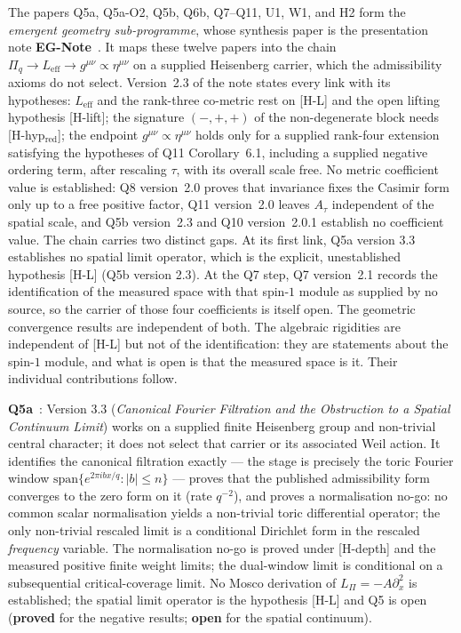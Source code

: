 \documentclass[11pt,a4paper]{article}
\newcommand{\sproved}{\textcolor{cproved}{\textbf{proved}}}
\newcommand{\sopen}{\textcolor{copen}{\textbf{open}}}
\begin{document}
    The papers Q5a, Q5a-O2, Q5b, Q6b, Q7--Q11, U1, W1, and H2 form the \emph{emergent geometry
  sub-programme}, whose synthesis paper is the presentation note \textbf{EG-Note}~\cite{Beau2026egnote}.
    It maps these twelve papers into the chain $\Pi_q \to L_{\mathrm{eff}} \to g^{\mu\nu} \propto \eta^{\mu\nu}$
    on a supplied Heisenberg carrier, which the admissibility axioms do not select.
    Version~2.3 of the note states every link with its hypotheses: $L_{\mathrm{eff}}$ and the rank-three co-metric
    rest on [H-L] and the open lifting hypothesis [H-lift]; the signature $(-,+,+)$ of the non-degenerate block
    needs [H-hyp$_{\mathrm{red}}$]; the endpoint $g^{\mu\nu} \propto \eta^{\mu\nu}$ holds only for a supplied rank-four
    extension satisfying the hypotheses of Q11 Corollary~6.1, including a supplied negative ordering term, after
    rescaling $\tau$, with its overall scale free.
    No metric coefficient value is established: Q8 version~2.0 proves that invariance fixes the Casimir form only up
    to a free positive factor, Q11 version~2.0 leaves $A_\tau$ independent of the spatial scale, and Q5b
    version~2.3 and Q10 version~2.0.1 establish no coefficient value.
    The chain carries two distinct gaps.
    At its first link, Q5a version 3.3 establishes no spatial limit operator, which is the explicit,
    unestablished hypothesis [H-L] (Q5b version 2.3).
    At the Q7 step, Q7 version~2.1 records the identification of the measured space with that
    spin-$1$ module as supplied by no source, so the carrier of those four coefficients is itself
    open.
    The geometric convergence results are independent of both.
    The algebraic rigidities are independent of [H-L] but not of the identification: they are
    statements about the spin-$1$ module, and what is open is that the measured space is it.
    Their individual contributions follow.

    \textbf{Q5a}~\cite{Beau2026q5a}: Version 3.3 (\emph{Canonical Fourier Filtration and the
    Obstruction to a Spatial Continuum Limit}) works on a supplied finite Heisenberg group and
    non-trivial central character; it does not select that carrier or its associated Weil action.
    It identifies the canonical filtration exactly ---
    the stage is precisely the toric Fourier window $\mathrm{span}\{e^{2\pi i b x/q}: |b| \le n\}$
    --- proves that the published admissibility form converges to the zero form on it (rate
    $q^{-2}$), and proves a normalisation no-go: no common scalar normalisation yields a
    non-trivial toric differential operator; the only non-trivial rescaled limit is a
    conditional Dirichlet form in the rescaled \emph{frequency} variable. The normalisation
    no-go is proved under [H-depth] and the measured positive finite weight limits; the dual-window
    limit is conditional on a subsequential critical-coverage limit.
    No Mosco derivation of $L_\Pi = -A\partial_x^2$ is established;
    the spatial limit operator is the hypothesis [H-L] and Q5 is open
    (\sproved{} for the negative results; \sopen{} for the spatial continuum).
\end{document}
